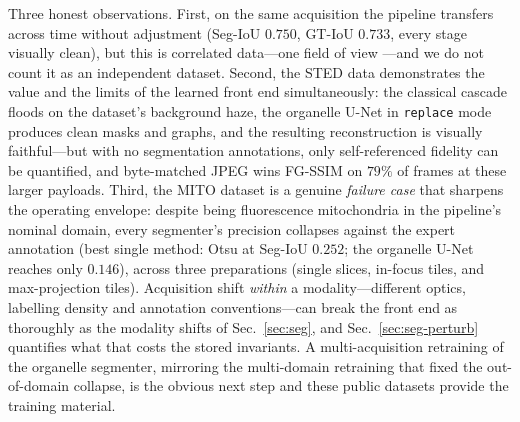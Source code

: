 \documentclass[10pt,a4paper]{article}
\begin{document}
Three honest observations. First, on the same acquisition the pipeline
transfers across time without adjustment (Seg-IoU $0.750$, GT-IoU $0.733$,
every stage visually clean), but this is correlated data---one field of view
---and we do not count it as an independent dataset. Second, the STED data
demonstrates the value and the limits of the learned front end
simultaneously: the classical cascade floods on the dataset's background
haze, the organelle U-Net in \texttt{replace} mode produces clean masks and
graphs, and the resulting reconstruction is visually faithful---but with no
segmentation annotations, only self-referenced fidelity can be quantified,
and byte-matched JPEG wins FG-SSIM on $79\%$ of frames at these larger
payloads. Third, the MITO dataset is a genuine \emph{failure case} that
sharpens the operating envelope: despite being fluorescence mitochondria in
the pipeline's nominal domain, every segmenter's precision collapses against
the expert annotation (best single method: Otsu at Seg-IoU $0.252$; the
organelle U-Net reaches only $0.146$), across three preparations
(single slices, in-focus tiles, and max-projection tiles). Acquisition
shift \emph{within} a modality---different optics, labelling density and
annotation conventions---can break the front end as thoroughly as the
modality shifts of Sec.~\ref{sec:seg}, and Sec.~\ref{sec:seg-perturb}
quantifies what that costs the stored invariants. A multi-acquisition
retraining of the organelle segmenter, mirroring the multi-domain retraining
that fixed the out-of-domain collapse, is the obvious next step and these
public datasets provide the training material.

\end{document}
